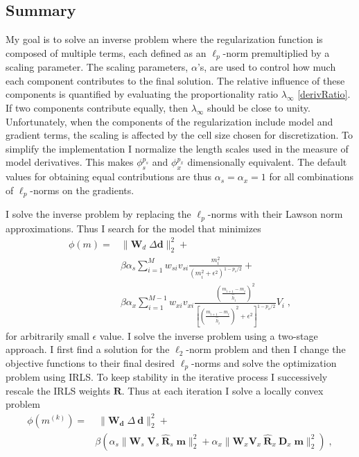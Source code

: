 \subsection{Summary}
My goal is to solve an inverse problem where the regularization function is composed of multiple terms, each defined as an $\ell_p$-norm premultiplied by a scaling parameter. The scaling parameters, $\alpha$'s, are used to control how much each component contributes to the final solution. The relative influence of these components is quantified by evaluating the proportionality ratio $\lambda_\infty$ \eqref{derivRatio}. If two components contribute equally, then $\lambda_\infty$ should be close to unity. Unfortunately, when the components of the regularization include model and gradient terms, the scaling is affected by the cell size chosen for discretization. To simplify the implementation I normalize the length scales used in the measure of model derivatives. This makes $\phi_s^{p_s}$ and $\phi_x^{p_x}$ dimensionally equivalent. The default values for obtaining equal contributions are thus $\alpha_s=\alpha_x=1$ for all combinations of $\ell_p$-norms on the gradients.

I solve the inverse problem by replacing the $\ell_p$-norms with their Lawson norm approximations. Thus I search for the model that minimizes
\begin{equation}\label{eq:GeneralLPProblem}
\begin{split}
\phi (m) =& \| \mathbf{W}_d\;\Delta\mathbf{d}\|_2^2 +\\
& \beta \alpha_s \sum_{i=1}^{M} w_{si} v_{si} \frac{m_i^2}{{{(m_i^{2} + \epsilon^2 )}^{1-p_s/2}} }  +\\
& \beta \alpha_x \sum_{i=1}^{M-1} w_{xi} v_{xi} \frac{\left(\frac{m_{i+1} - m_i}{ {\hat h}_i}\right)^2}{{{\left[\left(\frac{m_{i+1} - m_i}{{\hat h}_i}\right)^{2} + \epsilon^2 \right]}^{1-p_x/2}} }V_i \;,
\end{split}
\end{equation}
for arbitrarily small $\epsilon$ value.
I solve the inverse problem using a two-stage approach. I first find a solution for the $\ell_2$-norm problem and then I change the objective functions to their final desired $\ell_p$-norms and solve the optimization problem using IRLS. To keep stability in the iterative process I successively rescale the IRLS weights $\mathbf{R}$. Thus at each iteration I solve a locally convex problem
\begin{equation}\label{eq:LocalIRLS}
\begin{split}
\phi(m^{(k)}) =&\;\| \mathbf{W_\text{d}}\;\Delta\:\mathbf{d}\|_2^2 +\\
& \beta \left( \alpha_s \|\mathbf{W}_s\; \mathbf{V}_s\:\mathbf{\hat R}_s\;\mathbf{m}\|_2^2 + \alpha_x\| \mathbf{W}_x \mathbf{V}_x\:\mathbf{\hat R}_x\:\mathbf{D}_x\;\mathbf{m}\|_2^2 \right) \;,
\end{split}
\end{equation}

